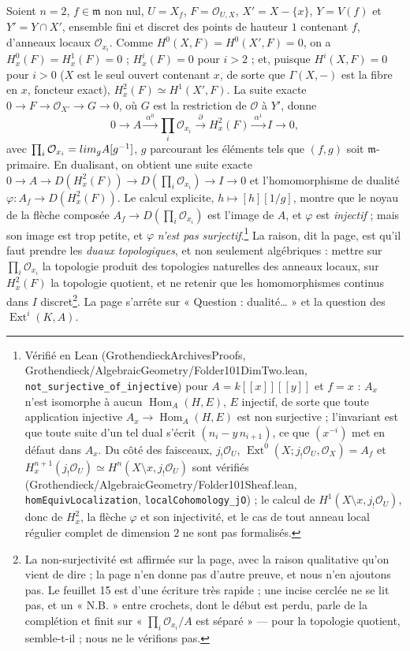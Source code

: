 \documentclass[11pt,a4paper]{article}
\begin{document}
Soient $n = 2$, $f \in \mathfrak{m}$ non nul, $U = X_f$, $F =
\mathcal{O}_{U,X}$, $X' = X - \{x\}$, $Y = V(f)$ et $Y' = Y \cap X'$, ensemble
fini et discret des points de hauteur $1$ contenant $f$, d'anneaux locaux
$\mathcal{O}_{x_i}$. Comme $H^0(X, F) = H^0(X', F) = 0$, on a $H^0_x(F) =
H^1_x(F) = 0$ ; $H^i_x(F) = 0$ pour $i > 2$ ; et, puisque $H^i(X, F) = 0$ pour
$i > 0$ ($X$ est le seul ouvert contenant $x$, de sorte que $\Gamma(X, -)$ est la fibre en $x$, foncteur exact), $H^2_x(F) \simeq H^1(X', F)$. La suite exacte $0 \to F \to
\mathcal{O}_{X'} \to G \to 0$, où $G$ est la restriction de $\mathcal{O}$ à
$Y'$, donne
\[
  0 \to A \xrightarrow{\ \alpha^0\ } \prod_i \mathcal{O}_{x_i}
  \xrightarrow{\ \partial\ } H^2_x(F) \xrightarrow{\ \alpha^1\ } I \to 0,
\]
avec $\prod_i \mathcal{O}_{x_i} = \varinjlim_g A[g^{-1}]$, $g$ parcourant les
éléments tels que $(f, g)$ soit $\mathfrak{m}$-primaire. En dualisant, on
obtient une suite exacte $0 \to A \to D(H^2_x(F)) \to D(\prod_i
\mathcal{O}_{x_i}) \to I \to 0$ et l'homomorphisme de dualité
$\varphi : A_f \to D(H^2_x(F))$. Le calcul explicite, $h \mapsto
[h][1/g]$, montre que le noyau de la flèche composée $A_f \to D(\prod_i
\mathcal{O}_{x_i})$ est l'image de $A$, et $\varphi$ est \emph{injectif} ; mais
son image est trop petite, et $\varphi$ \emph{n'est pas surjectif}.\footnote{Vérifié en Lean
(GrothendieckArchivesProofs, Grothendieck/AlgebraicGeometry/Folder101DimTwo.lean,
\texttt{not\_surjective\_of\_injective}) pour $A = k[[x]][[y]]$ et $f = x$ :
$A_x$ n'est isomorphe à aucun $\operatorname{Hom}_A(H, E)$, $E$ injectif, de sorte
que toute application injective $A_x \to \operatorname{Hom}_A(H, E)$ est non
surjective ; l'invariant est que toute suite d'un tel dual s'écrit
$(n_i - y\,n_{i+1})$, ce que $(x^{-i})$ met en défaut dans $A_x$. Du côté des faisceaux, $j_!\mathcal{O}_U$,
$\operatorname{Ext}^0(X; j_!\mathcal{O}_U, \mathcal{O}_X) = A_f$ et
$H^{n+1}_x(j_!\mathcal{O}_U) \simeq H^n(X \setminus x, j_!\mathcal{O}_U)$ sont
vérifiés (Grothendieck/AlgebraicGeometry/Folder101Sheaf.lean, \texttt{homEquivLocalization},
\texttt{localCohomology\_jO}) ; le calcul de $H^1(X \setminus x, j_!\mathcal{O}_U)$,
donc de $H^2_x$, la flèche $\varphi$ et son injectivité, et le cas de tout anneau
local régulier complet de dimension $2$ ne sont pas formalisés.} La raison,
dit la page, est qu'il faut prendre les \emph{duaux topologiques}, et non
seulement algébriques : mettre sur $\prod_i \mathcal{O}_{x_i}$ la topologie
produit des topologies naturelles des anneaux locaux, sur $H^2_x(F)$ la
topologie quotient, et ne retenir que les homomorphismes continus dans $I$
discret\footnote{La non-surjectivité est affirmée sur la page, avec la raison
qualitative qu'on vient de dire ; la page n'en donne pas d'autre preuve, et
nous n'en ajoutons pas. Le feuillet 15 est d'une écriture très rapide ; une
incise cerclée ne se lit pas, et un « N.B. » entre crochets, dont le début est
perdu, parle de la complétion et finit sur « $\prod_i \mathcal{O}_{x_i}/A$ est
séparé » --- pour la topologie quotient, semble-t-il ; nous ne le vérifions
pas.}. La page
s'arrête sur « Question : dualité… » et la question des
$\operatorname{Ext}^i(K, A)$.
\end{document}
